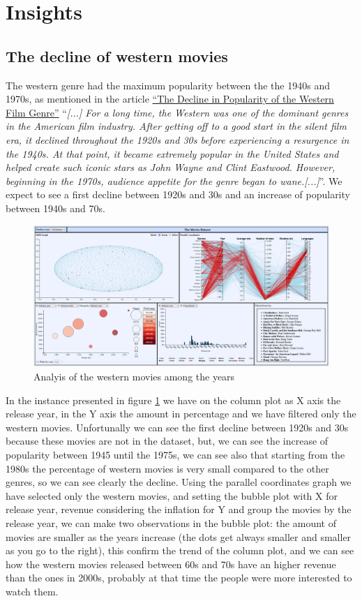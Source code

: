 \documentclass[]{article}
\newcommand{\quotes}[1]{``#1''}
\begin{document}
\section{Insights}
\subsection{The decline of western movies}
The western genre had the maximum popularity between the the 1940s and 1970s, as mentioned in the article \href{https://screenculturejournal.com/2017/04/the-decline-in-popularity-of-the-western-film-genre/}{\quotes{The Decline in Popularity of the Western Film Genre}} \quotes{\emph{[...] For a long time, the Western was one of the dominant genres in the American film industry. After getting off to a good start in the silent film era, it declined throughout the 1920s and 30s before experiencing a resurgence in the 1940s. At that point, it became extremely popular in the United States and helped create such iconic stars as John Wayne and Clint Eastwood. However, beginning in the 1970s, audience appetite for the genre began to wane.[...]}}.
We expect to see a first decline between 1920s and 30s and an increase of popularity between 1940s and 70s.
\begin{figure}[H]
	\centering
	\includegraphics[width=1\linewidth]{images/insights_western}
	\caption[Western movies trend]{Analyis of the western movies among the years}
	\label{fig:insightswestern}
\end{figure}
In the instance presented in figure \ref{fig:insightswestern} we have on the column plot as X axis the release year, in the Y axis the amount in percentage and we have filtered only the western movies. Unfortunally we can see the first decline between 1920s and 30s because these movies are not in the dataset, but, we can see the increase of popularity between 1945 until the 1975s, we can see also that starting from the 1980s the percentage of western movies is very small compared to the other genres, so we can see clearly the decline.\newline
Using the parallel coordinates graph we have selected only the western movies, and setting the bubble plot with X for release year, revenue considering the inflation for Y and group the movies by the release year, we can make two observations in the bubble plot: the amount of movies are smaller as the years increase (the dots get always smaller and smaller as you go to the right), this confirm the trend of the column plot, and we can see how the western movies released between 60s and 70s have an higher revenue than the ones in 2000s, probably at that time the people were more interested to watch them.
\end{document}
